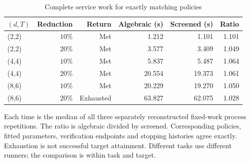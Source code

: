 \begin{table}[htbp]\centering
\caption{Complete service work for exactly matching policies}\label{tab:matched-work59}
{\small\setlength{\tabcolsep}{3pt}\begin{tabular}{lrrrrr}
\hline
$(d,T)$ & Reduction & Return & Algebraic (s) & Screened (s) & Ratio \\
\hline
(2,2) & $10\%$ & Met & 1.212 & 1.101 & 1.101 \\
(2,2) & $20\%$ & Met & 3.577 & 3.409 & 1.049 \\
(4,4) & $10\%$ & Met & 5.837 & 5.487 & 1.064 \\
(4,4) & $20\%$ & Met & 20.554 & 19.373 & 1.061 \\
(8,6) & $10\%$ & Met & 20.229 & 19.270 & 1.050 \\
(8,6) & $20\%$ & Exhausted & 63.827 & 62.075 & 1.028 \\
\hline\end{tabular}}\par\smallskip
{\footnotesize Each time is the median of all three separately reconstructed fixed-work process repetitions. The ratio is algebraic divided by screened. Corresponding policies, fitted parameters, verification endpoints and stopping histories agree exactly. Exhaustion is not successful target attainment. Different tasks use different runners; the comparison is within task and target.}
\end{table}
